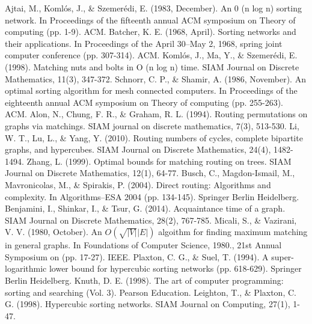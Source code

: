 \documentclass[runningheads,a4paper]{llncs}
\begin{document}
\begin{thebibliography}{4}
	
	 Ajtai, M., Komlós, J., \& Szemerédi, E. (1983, December). An 0 (n log n) sorting network. In Proceedings of the fifteenth annual ACM symposium on Theory of computing (pp. 1-9). ACM.
	Batcher, K. E. (1968, April). Sorting networks and their applications. In Proceedings of the April 30--May 2, 1968, spring joint computer conference (pp. 307-314). ACM.
	Komlós, J., Ma, Y., \& Szemerédi, E. (1998). Matching nuts and bolts in O (n log n) time. SIAM Journal on Discrete Mathematics, 11(3), 347-372.
	Schnorr, C. P., \& Shamir, A. (1986, November). An optimal sorting algorithm for mesh connected computers. In Proceedings of the eighteenth annual ACM symposium on Theory of computing (pp. 255-263). ACM.
	 Alon, N., Chung, F. R., \& Graham, R. L. (1994). Routing permutations on graphs via matchings. SIAM journal on discrete mathematics, 7(3), 513-530.
	Li, W. T., Lu, L., \& Yang, Y. (2010). Routing numbers of cycles, complete bipartite graphs, and hypercubes. SIAM Journal on Discrete Mathematics, 24(4), 1482-1494.
	Zhang, L. (1999). Optimal bounds for matching routing on trees. SIAM Journal on Discrete Mathematics, 12(1), 64-77.
	Busch, C., Magdon-Ismail, M., Mavronicolas, M., \& Spirakis, P. (2004). Direct routing: Algorithms and complexity. In Algorithms–ESA 2004 (pp. 134-145). Springer Berlin Heidelberg.
	Benjamini, I., Shinkar, I., \& Tsur, G. (2014). Acquaintance time of a graph. SIAM Journal on Discrete Mathematics, 28(2), 767-785.
	 Micali, S., \& Vazirani, V. V. (1980, October). An $  O(\sqrt{|V|}|E|) $ algoithm for finding maximum matching in general graphs. In Foundations of Computer Science, 1980., 21st Annual Symposium on (pp. 17-27). IEEE.
	Plaxton, C. G., \& Suel, T. (1994). A super-logarithmic lower bound for hypercubic sorting networks (pp. 618-629). Springer Berlin Heidelberg.
	Knuth, D. E. (1998). The art of computer programming: sorting and searching (Vol. 3). Pearson Education.
	 Leighton, T., \& Plaxton, C. G. (1998). Hypercubic sorting networks. SIAM Journal on Computing, 27(1), 1-47.
\end{thebibliography}
\end{document}
